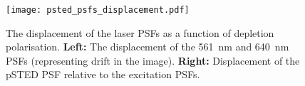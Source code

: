 \begin{figure}
	\centering
	\texttt{[image: psted\_psfs\_displacement.pdf]}
	\caption{
		The displacement of the laser PSFs as a function of depletion polarisation. \textbf{Left:} The displacement of the 561~nm and 640~nm PSFs (representing drift in the image). \textbf{Right:} Displacement of the pSTED PSF relative to the excitation PSFs.
	}
	\label{fig:psted displacement}
\end{figure}